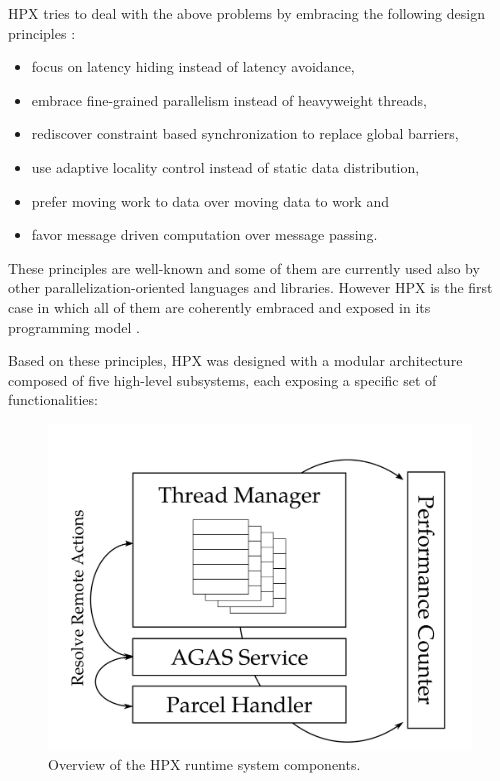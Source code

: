 HPX tries to deal with the above problems by embracing the following design principles \cite{kaiser2014hpx}:
\begin{itemize}
	\item focus on latency hiding instead of latency avoidance,
	\item embrace fine-grained parallelism instead of heavyweight threads,
	\item rediscover constraint based synchronization to replace global barriers,
	\item use adaptive locality control instead of static data distribution, 
	\item prefer moving work to data over moving data to work and 
	\item favor message driven computation over message passing.
\end{itemize}
These principles are well-known and some of them are currently used also by other parallelization-oriented languages and libraries. However HPX is the first case in which all of them are coherently embraced and exposed in its programming model \cite{kaiser2014hpx}.

Based on these principles, HPX was designed with a modular architecture composed of five high-level subsystems, each exposing a specific set of functionalities:

\begin{figure}[b]
 	\begin{center}
 		\includegraphics[scale=0.18]{Figures/hpxArchitecture.png}
 		\caption{Overview of the HPX runtime system components\cite{heller2017hpx}.}\label{fig:hpxArchitecture}
 	\end{center}
\end{figure}
~\\ 

